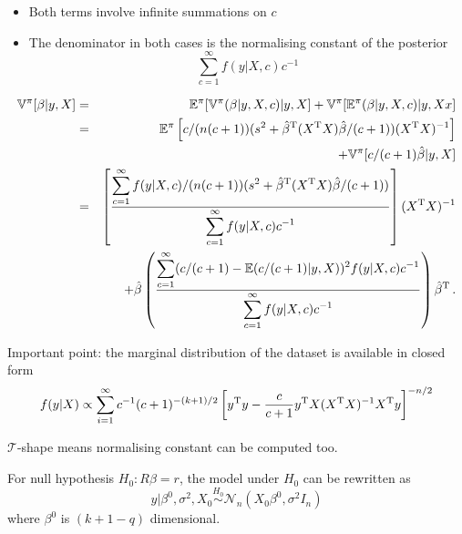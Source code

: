 \begin{slide}
\begin{itemize}
\item Both terms involve infinite summations on $c$

\item The denominator in both cases is the normalising constant of the posterior
$$
{\displaystyle \sum_{c=1}^\infty f(y|X,c)c^{-1}}
$$
\end{itemize}

\end{slide}\begin{slide}
\footnotesize
\begin{eqnarray*}
\mathbb{V}^\pi[\beta|y,X] & = & \mathbb{E}^\pi[\mathbb{V}^\pi(\beta|y,X,c)|y,X]+\mathbb{V}^\pi[\mathbb{E}^\pi(\beta|y,X,c)|y,Xx] \\
                      & = & \mathbb{E}^\pi\left[c/(n(c+1))(s^2+\hat\beta^{\mathrm{T}}(X^{\mathrm{T}} X)\hat\beta/(c+1))(X^{\mathrm{T}} X)^{-1}\right] \\
                      &   & \qquad\qquad +\mathbb{V}^\pi[c/(c+1)\hat\beta|y,X] \\
                      & = & \left[\frac{\displaystyle \sum_{c=1}^\infty f(y|X,c)/(n(c+1))(s^2+\hat\beta^{\mathrm{T}}(X^{\mathrm{T}} X)\hat\beta/(c+1))}
                            {\displaystyle \sum_{c=1}^\infty f(y|X,c)c^{-1}}\right](X^{\mathrm{T}} X)^{-1} \\
                      &   & +\hat\beta\left(\frac{\displaystyle \sum_{c=1}^\infty (c/(c+1)-\mathbb{E}(c/(c+1)|y,X))^2f(y|X,c)c^{-1}}
                            {\displaystyle \sum_{c=1}^\infty f(y|X,c)c^{-1}}\right)\hat\beta^{\mathrm{T}}\,.
\end{eqnarray*}
\normalsize

\end{slide}\begin{slide}

Important point: the marginal distribution of the dataset is available in
closed form
\small
$$
f(y|X)\propto \sum_{i=1}^\infty c^{-1}(c+1)^{-(k+1)/2}\left[y^{\mathrm{T}} y
-\frac{c}{c+1}y^{\mathrm{T}} X(X^{\mathrm{T}} X)^{-1}X^{\mathrm{T}} y\right]^{-n/2}
$$
\normalsize

\pause
\vs $\mathcal{T}$-shape means normalising constant can be computed too.

\end{slide}\begin{slide}

For null hypothesis $H_0:R\beta=r$, the model under $H_0$ can be rewritten as
$$
y|\beta^0,\sigma^2,X_0\stackrel{H_0}{\sim}\mathscr{N}_n\left(X_0\beta^0,\sigma^2I_n\right)
$$
where $\beta^0$ is $(k+1-q)$ dimensional. 


\end{slide}
